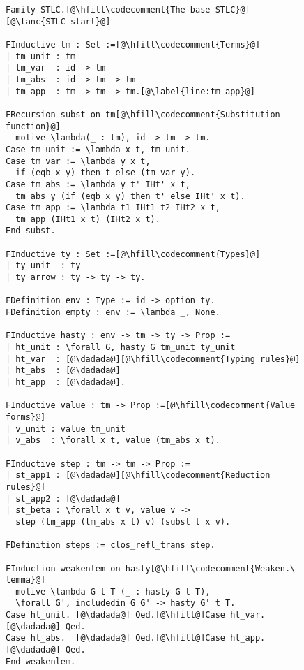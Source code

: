 \begin{figure}
\vspace{-10pt}
\begin{minipage}{\textwidth}
\begin{multicols}{2}



\begin{lstlisting}
Family STLC.[@\hfill\codecomment{The base STLC}@][@\tanc{STLC-start}@]

FInductive tm : Set :=[@\hfill\codecomment{Terms}@]
| tm_unit : tm
| tm_var  : id -> tm
| tm_abs  : id -> tm -> tm
| tm_app  : tm -> tm -> tm.[@\label{line:tm-app}@]

FRecursion subst on tm[@\hfill\codecomment{Substitution function}@] 
  motive \lambda(_ : tm), id -> tm -> tm.
Case tm_unit := \lambda x t, tm_unit.
Case tm_var := \lambda y x t,
  if (eqb x y) then t else (tm_var y).
Case tm_abs := \lambda y t' IHt' x t,
  tm_abs y (if (eqb x y) then t' else IHt' x t).
Case tm_app := \lambda t1 IHt1 t2 IHt2 x t,
  tm_app (IHt1 x t) (IHt2 x t).
End subst.

FInductive ty : Set :=[@\hfill\codecomment{Types}@]
| ty_unit  : ty
| ty_arrow : ty -> ty -> ty.

FDefinition env : Type := id -> option ty.
FDefinition empty : env := \lambda _, None.

FInductive hasty : env -> tm -> ty -> Prop :=
| ht_unit : \forall G, hasty G tm_unit ty_unit
| ht_var  : [@\dadada@][@\hfill\codecomment{Typing rules}@]
| ht_abs  : [@\dadada@]
| ht_app  : [@\dadada@].

FInductive value : tm -> Prop :=[@\hfill\codecomment{Value forms}@]
| v_unit : value tm_unit
| v_abs  : \forall x t, value (tm_abs x t).

FInductive step : tm -> tm -> Prop :=
| st_app1 : [@\dadada@][@\hfill\codecomment{Reduction rules}@]
| st_app2 : [@\dadada@]
| st_beta : \forall x t v, value v ->
  step (tm_app (tm_abs x t) v) (subst t x v).

FDefinition steps := clos_refl_trans step.

FInduction weakenlem on hasty[@\hfill\codecomment{Weaken.\ lemma}@]
  motive \lambda G t T (_ : hasty G t T),
  \forall G', includedin G G' -> hasty G' t T.
Case ht_unit. [@\dadada@] Qed.[@\hfill@]Case ht_var. [@\dadada@] Qed.
Case ht_abs.  [@\dadada@] Qed.[@\hfill@]Case ht_app. [@\dadada@] Qed.
End weakenlem.


\end{lstlisting}
\end{multicols}
\end{minipage}
\end{figure}
